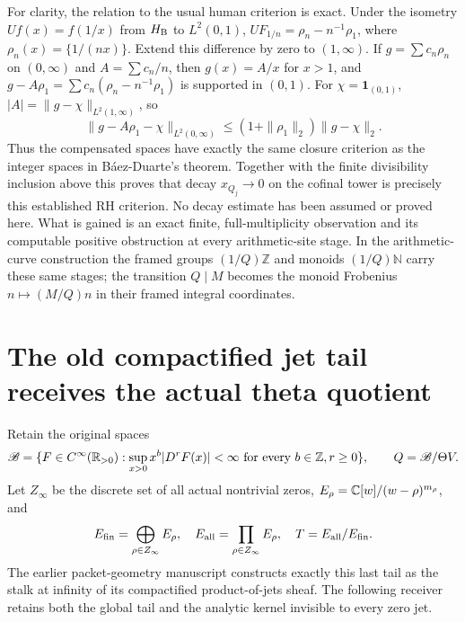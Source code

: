 \documentclass[11pt]{article}
\begin{document}
For clarity, the relation to the usual human criterion is exact. Under the
isometry $Uf(x)=f(1/x)$ from $H_{\rm B}$ to $L^2(0,1)$,
$UF_{1/n}=\rho_n-n^{-1}\rho_1$, where
$\rho_n(x)=\{1/(nx)\}$. Extend this difference by zero to $(1,\infty)$.
If $g=\sum c_n\rho_n$ on $(0,\infty)$ and $A=\sum c_n/n$, then
$g(x)=A/x$ for $x>1$, and
$g-A\rho_1=\sum c_n(\rho_n-n^{-1}\rho_1)$ is supported in $(0,1)$.
For $\chi=\mathbf1_{(0,1)}$,
$|A|=\|g-\chi\|_{L^2(1,\infty)}$, so
\[
 \|g-A\rho_1-\chi\|_{L^2(0,\infty)}
 \leq (1+\|\rho_1\|_2)\|g-\chi\|_2.
\]
Thus the compensated spaces have exactly the same closure criterion as
the integer spaces in B\'aez-Duarte's theorem. Together with the finite
divisibility inclusion above this proves that decay $x_{Q_j}\to0$ on the
cofinal tower is precisely this established RH criterion. No decay estimate
has been assumed or proved here. What is gained is an exact finite,
full-multiplicity observation and its computable positive obstruction at
every arithmetic-site stage. In the arithmetic-curve construction the
framed groups $(1/Q)\mathbb Z$ and monoids $(1/Q)\mathbb N$ carry these
same stages; the transition $Q\mid M$ becomes the monoid Frobenius
$n\mapsto (M/Q)n$ in their framed integral coordinates.

\section{The old compactified jet tail receives the actual theta quotient}
Retain the original spaces
\[
 \mathscr B=\{F\in C^\infty(\mathbb R_{>0}):\sup_{x>0}x^b|D^rF(x)|<\infty
                      \text{ for every }b\in\mathbb Z,r\geq0\},
 \qquad Q=\mathscr B/\Theta V.
\]
Let $Z_\infty$ be the discrete set of all actual nontrivial zeros,
$E_\rho=\mathbb C[w]/(w-\rho)^{m_\rho}$, and
\[
 E_{\rm fin}=\bigoplus_{\rho\in Z_\infty}E_\rho,\quad
 E_{\rm all}=\prod_{\rho\in Z_\infty}E_\rho,\quad
 T=E_{\rm all}/E_{\rm fin}.
\]
The earlier packet-geometry manuscript constructs exactly this last
tail as the stalk at infinity of its compactified product-of-jets sheaf.
The following receiver retains both the global tail and the analytic
kernel invisible to every zero jet.
\end{document}
